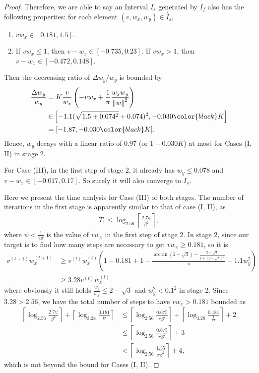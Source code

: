 \documentclass{article}
\theoremstyle{plain}
\theoremstyle{remark}
\newcommand{\red}[1]{{\color{black}#1}}
\newcommand{\norm}[1]{\left\lVert#1\right\rVert}
\def\t{^{(t)}}
\def\tt{^{(t+1)}}
\begin{document}
\begin{proof}
Therefore, we are able to say an Interval $\hat{I}_s$ generated by $I_f$ also has the following properties: for each element $(v,w_x,w_y)\in \hat{I}_s$,
\begin{enumerate}
    \item $vw_x\in[0.181,1.5]$.
    \item If $vw_x\le 1$, then $v-w_x\in [-0.735, 0.23]$. If $vw_x>1$, then $v-w_x\in [-0.472, 0.148]$.
\end{enumerate}

Then the decreasing ratio of $\Delta w_y/w_y$ is bounded by
\begin{align}
    \frac{\Delta w_y}{w_y} &= K\frac{v}{w_x}\left(-vw_x + \frac{1}{\pi}\frac{w_x w_y}{\norm{w}^2}\right)\\
    &\in
    \left[
        -1.1(\sqrt{1.5+0.074^2}+0.074)^2, -0.030 \red{K}
    \right]\\
    &=[-1.87, -0.030\red{K}].
\end{align}
Hence, $w_y$ decays with a linear ratio of $0.97$ \red{(or $1-0.030K$)} at most for Cases (I, II) in stage 2.

For Case (III), in the first step of stage 2, it already has $w_y\le 0.078$ and $v-w_x\in[-0.017, 0.17]$. So surely it will also converge to $I_s$.

Here we present the time analysis for Case (III) of both stages. The number of iterations in the first stage is apparently similar to that of case (I, II), as
\begin{align}
    T_1 \le \log_{2.56} \left\lceil\frac{2.7 \psi}{\beta^2} \right\rceil,
\end{align}
where $\psi<\frac{1}{4\pi}$ is the value of $vw_x$ in the first step of stage 2. In stage 2, since our target is to find how many steps are necessary to get $vw_x\ge 0.181$, so it is
\begin{align}
    v\tt w_x\tt
    &\ge v\t w_x\t\left(
    1-0.181+1-\frac{\arctan(2-\sqrt{3})-\frac{2-\sqrt{3}}{1+(2-\sqrt{3})^2}}{\pi} - 1.1 w_y^2
    \right)\\
    &\ge 3.28 v\t w_x\t.
\end{align}
where obviously it still holds $\frac{w_y}{w_x}\le 2-\sqrt{3}$ and $w_y^2<0.1^2$ in stage 2. Since $3.28>2.56$, we have the total number of steps to have $vw_x>0.181$ bounded as
\begin{align}
    \left\lceil\log_{2.56} \frac{2.7 \psi}{\beta^2}\right\rceil + \left\lceil\log_{3.28} \frac{0.181}{\psi}\right\rceil 
    &\le
    \left\lceil\log_{2.56} \frac{0.675}{\pi\beta^2}\right\rceil + \left\lceil\log_{3.28} \frac{0.181}{\frac{1}{4\pi}}\right\rceil + 2\nonumber \\
    &\le \left\lceil\log_{2.56} \frac{0.675}{\pi\beta^2}\right\rceil + 3 \nonumber \\
    &< \left\lceil\log_{2.56} \frac{1.35}{\pi\beta^2}\right\rceil + 4, \nonumber
\end{align} 
which is not beyond the bound for Cases (I, II).
\end{proof}%
\end{document}
